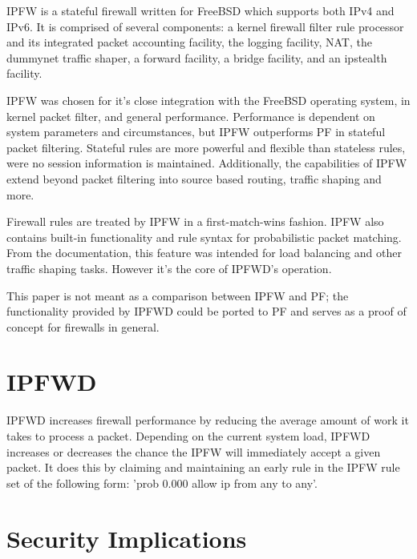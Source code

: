 \documentclass[journal]{IEEEtran}
\begin{document}
IPFW is a stateful firewall written for FreeBSD which supports both IPv4 and
IPv6. It is comprised of several components: a kernel firewall filter rule
processor and its integrated packet accounting facility, the logging facility,
NAT, the dummynet traffic shaper, a forward facility, a bridge facility, and
an ipstealth facility.

IPFW was chosen for it's close integration with the FreeBSD operating system,
in kernel packet filter, and general performance. Performance is dependent on
system parameters and circumstances, but IPFW outperforms PF in stateful packet
filtering. Stateful rules are more powerful and flexible than stateless rules,
were no session information is maintained. Additionally, the capabilities of
IPFW extend beyond packet filtering into source based routing, traffic shaping
and more. 

Firewall rules are treated by IPFW in a first-match-wins fashion. IPFW also
contains built-in functionality and rule syntax for probabilistic packet
matching. From the documentation, this feature was intended for load balancing
and other traffic shaping tasks. However it's the core of IPFWD's operation. 

This paper is not meant as a comparison between IPFW and PF; the functionality
provided by IPFWD could be ported to PF and serves as a proof of concept for
firewalls in general.


\section{IPFWD}

IPFWD increases firewall performance by reducing the average amount of work it
takes to process a packet. Depending on the current system load, IPFWD
increases or decreases the chance the IPFW will immediately accept a given
packet. It does this by claiming and maintaining an early rule in the IPFW rule
set of the following form: 'prob 0.000 allow ip from any to any'. 




\blindtext


\section{Security Implications}
\end{document}
